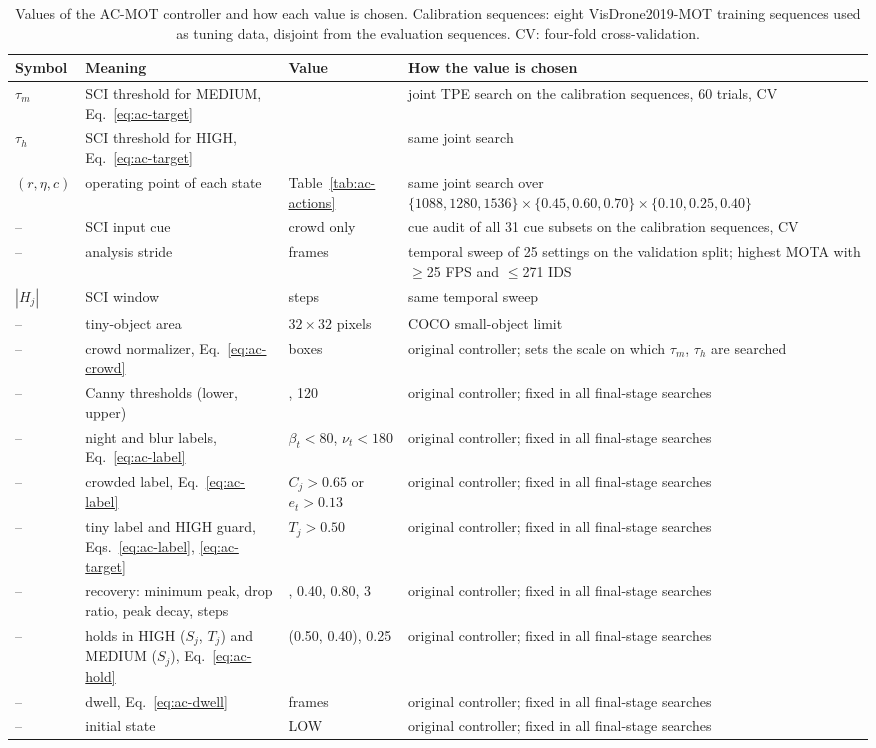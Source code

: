 \begin{table}[tbp]
\centering
\caption{Values of the AC-MOT controller and how each value is chosen. Calibration sequences: eight VisDrone2019-MOT training sequences used as tuning data, disjoint from the evaluation sequences. CV: four-fold cross-validation.}
\label{tab:ac-constants}
\begin{tabular}{>{\raggedright\arraybackslash}p{1.5cm}>{\raggedright\arraybackslash}p{4.3cm}>{\raggedright\arraybackslash}p{2.4cm}>{\raggedright\arraybackslash}p{5.2cm}}
\toprule
Symbol & Meaning & Value & How the value is chosen\\
\midrule
$\tau_m$ & SCI threshold for MEDIUM, Eq.~\eqref{eq:ac-target} & 0.297 & joint TPE search on the calibration sequences, 60 trials, CV\\
$\tau_h$ & SCI threshold for HIGH, Eq.~\eqref{eq:ac-target} & 0.511 & same joint search\\
$(r,\eta,c)$ & operating point of each state & Table~\ref{tab:ac-actions} & same joint search over $\{1088,1280,1536\}\times\{0.45,0.60,0.70\}\times\{0.10,0.25,0.40\}$\\
-- & SCI input cue & crowd only & cue audit of all 31 cue subsets on the calibration sequences, CV\\
-- & analysis stride & 10 frames & temporal sweep of 25 settings on the validation split; highest MOTA with $\geq$25 FPS and $\leq$271 IDS\\
$|H_j|$ & SCI window & 7 steps & same temporal sweep\\
-- & tiny-object area & $32\times32$ pixels & COCO small-object limit \cite{lin2014coco}\\
-- & crowd normalizer, Eq.~\eqref{eq:ac-crowd} & 30 boxes & original controller; sets the scale on which $\tau_m$, $\tau_h$ are searched\\
-- & Canny thresholds (lower, upper) & 50, 120 & original controller; fixed in all final-stage searches\\
-- & night and blur labels, Eq.~\eqref{eq:ac-label} & $\beta_t<80$, $\nu_t<180$ & original controller; fixed in all final-stage searches\\
-- & crowded label, Eq.~\eqref{eq:ac-label} & $C_j>0.65$ or $e_t>0.13$ & original controller; fixed in all final-stage searches\\
-- & tiny label and HIGH guard, Eqs.~\eqref{eq:ac-label}, \eqref{eq:ac-target} & $T_j>0.50$ & original controller; fixed in all final-stage searches\\
-- & recovery: minimum peak, drop ratio, peak decay, steps & 5, 0.40, 0.80, 3 & original controller; fixed in all final-stage searches\\
-- & holds in HIGH ($S_j$, $T_j$) and MEDIUM ($S_j$), Eq.~\eqref{eq:ac-hold} & (0.50, 0.40), 0.25 & original controller; fixed in all final-stage searches\\
-- & dwell, Eq.~\eqref{eq:ac-dwell} & 30 frames & original controller; fixed in all final-stage searches\\
-- & initial state & LOW & original controller; fixed in all final-stage searches\\
\bottomrule
\end{tabular}
\end{table}

